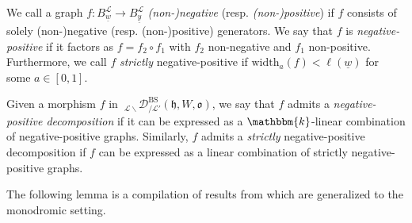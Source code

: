 \documentclass{amsart}
\renewcommand{\k}{\mathbbm{k}}
\newcommand{\scrL}{\mathcal{L}}
\newcommand{\fr}[1]{\mathfrak{#1}}
\DeclareMathOperator{\BS}{BS}
\newcommand{\EWmon}[2]{\:_{#1 \backslash} \mathcal{D}_{/ #2} }
\newcommand{\uw}{\underline{w}}
\newcommand{\uy}{\underline{y}}
\theoremstyle{definition}
\numberwithin{equation}{subsection}
\begin{document}
We call a graph $f : B_{\uw}^{\scrL} \to B_{\uy}^{\scrL}$ \emph{(non-)negative} (resp. \emph{(non-)positive}) if $f$ consists of solely (non-)negative (resp. (non-)positive) generators.
We say that $f$ is \emph{negative-positive} if it factors as $f = f_2 \circ f_1$ with $f_2$ non-negative and $f_1$ non-positive.
Furthermore, we call $f$ \emph{strictly} negative-positive if $\text{width}_a (f) < \ell (\uw)$ for some $a \in [0,1]$. 

Given a morphism $f$ in $\EWmon{\scrL}{\scrL'}^{\BS} (\fr{h}, W, \fr{o})$, we say that $f$ admits a \emph{negative-positive decomposition} if it can be expressed as a $\k$-linear combination of negative-positive graphs. 
Similarly, $f$ admits a \emph{strictly} negative-positive decomposition if $f$ can be expressed as a linear combination of strictly negative-positive graphs.

The following lemma is a compilation of results from \cite[\S 7.1]{EW} which are generalized to the monodromic setting.
\end{document}
